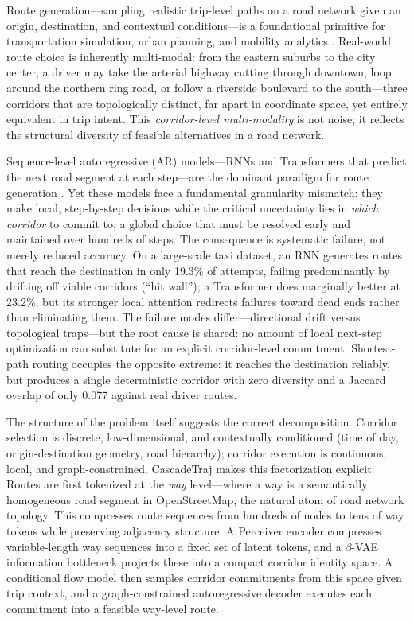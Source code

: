 
Route generation---sampling realistic trip-level paths on a road network given an origin, destination, and contextual conditions---is a foundational primitive for transportation simulation, urban planning, and mobility analytics \citep{gonzalez2008mobility,rong2025odsurvey}.
Real-world route choice is inherently multi-modal: from the eastern suburbs to the city center, a driver may take the arterial highway cutting through downtown, loop around the northern ring road, or follow a riverside boulevard to the south---three corridors that are topologically distinct, far apart in coordinate space, yet entirely equivalent in trip intent.
This \emph{corridor-level multi-modality} is not noise; it reflects the structural diversity of feasible alternatives in a road network.

Sequence-level autoregressive (AR) models---RNNs and Transformers that predict the next road segment at each step---are the dominant paradigm for route generation \citep{kong2023mobility_survey,zhu2025survey}.
Yet these models face a fundamental granularity mismatch: they make local, step-by-step decisions while the critical uncertainty lies in \emph{which corridor} to commit to, a global choice that must be resolved early and maintained over hundreds of steps.
The consequence is systematic failure, not merely reduced accuracy.
On a large-scale taxi dataset, an RNN generates routes that reach the destination in only 19.3\% of attempts, failing predominantly by drifting off viable corridors (``hit wall''); a Transformer does marginally better at 23.2\%, but its stronger local attention redirects failures toward dead ends rather than eliminating them.
The failure modes differ---directional drift versus topological traps---but the root cause is shared: no amount of local next-step optimization can substitute for an explicit corridor-level commitment.
Shortest-path routing occupies the opposite extreme: it reaches the destination reliably, but produces a single deterministic corridor with zero diversity and a Jaccard overlap of only 0.077 against real driver routes.

The structure of the problem itself suggests the correct decomposition.
Corridor selection is discrete, low-dimensional, and contextually conditioned (time of day, origin-destination geometry, road hierarchy); corridor execution is continuous, local, and graph-constrained.
CascadeTraj makes this factorization explicit.
Routes are first tokenized at the \emph{way} level---where a way is a semantically homogeneous road segment in OpenStreetMap, the natural atom of road network topology.
This compresses route sequences from hundreds of nodes to tens of way tokens while preserving adjacency structure.
A Perceiver encoder compresses variable-length way sequences into a fixed set of latent tokens, and a $\beta$-VAE information bottleneck projects these into a compact corridor identity space.
A conditional flow model then samples corridor commitments from this space given trip context, and a graph-constrained autoregressive decoder executes each commitment into a feasible way-level route.

